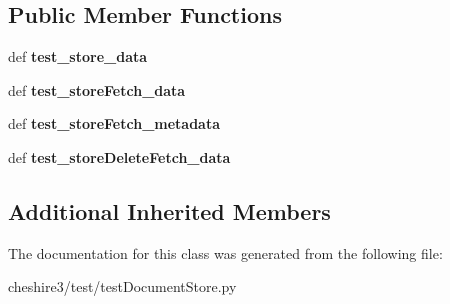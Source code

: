 \subsection*{Public Member Functions}
\begin{DoxyCompactItemize}
\item 
\hypertarget{classcheshire3_1_1test_1_1test_document_store_1_1_document_store_test_case_a67910eb4c8db773de35a710379d2c6fb}{def {\bfseries test\-\_\-store\-\_\-data}}\label{classcheshire3_1_1test_1_1test_document_store_1_1_document_store_test_case_a67910eb4c8db773de35a710379d2c6fb}

\item 
\hypertarget{classcheshire3_1_1test_1_1test_document_store_1_1_document_store_test_case_a9d57ac6648289c910c1350fd8c1cfd75}{def {\bfseries test\-\_\-store\-Fetch\-\_\-data}}\label{classcheshire3_1_1test_1_1test_document_store_1_1_document_store_test_case_a9d57ac6648289c910c1350fd8c1cfd75}

\item 
\hypertarget{classcheshire3_1_1test_1_1test_document_store_1_1_document_store_test_case_ae9f873ae64dff768a34e194f64285f88}{def {\bfseries test\-\_\-store\-Fetch\-\_\-metadata}}\label{classcheshire3_1_1test_1_1test_document_store_1_1_document_store_test_case_ae9f873ae64dff768a34e194f64285f88}

\item 
\hypertarget{classcheshire3_1_1test_1_1test_document_store_1_1_document_store_test_case_acd9bd929c783feae81bbca9e1cdfd940}{def {\bfseries test\-\_\-store\-Delete\-Fetch\-\_\-data}}\label{classcheshire3_1_1test_1_1test_document_store_1_1_document_store_test_case_acd9bd929c783feae81bbca9e1cdfd940}

\end{DoxyCompactItemize}
\subsection*{Additional Inherited Members}


The documentation for this class was generated from the following file\-:\begin{DoxyCompactItemize}
\item 
cheshire3/test/test\-Document\-Store.\-py\end{DoxyCompactItemize}
